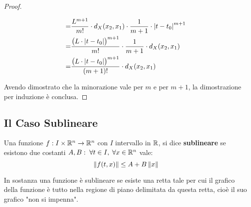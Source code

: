 \begin{theorem}
\begin{proof}
\begin{itemize}
\begin{align*}
				= &\frac{L^{m+1}}{m!} \cdot d_X(x_2,x_1)
				\cdot \frac{1}{m+1} \cdot \left|t-t_0\right|^{m+1}\\
				= &\frac{\bigl(L \cdot \left|t-t_0\right|\bigr)^{m+1}}{m!} \cdot \frac{1}{m+1} \cdot d_X(x_2,x_1)\\
				= &\frac{\bigl(L \cdot \left|t-t_0\right|\bigr)^{m+1}}{(m+1)!} \cdot d_X(x_2,x_1)
			\end{align*}
		\end{itemize}
		Avendo dimostrato che la minorazione vale per $m$ e per $m+1$, la dimostrazione per induzione è conclusa.
	\end{proof}
\end{theorem}
\cbend

\subsection{Il Caso Sublineare}
\begin{definition}
	\label{def:sublineare}
	Una funzione $f:I\times\mathbb{R}^n\to \mathbb{R}^n$ con $I$ intervallo in $\mathbb{R}$, si dice \textbf{sublineare} se esistono due costanti $A, B:\; \forall t \in I,\;\forall x \in \mathbb{R}^n$ vale:
	\[\left\|f(t,x)\right\|\leq A + B \left\|x\right\|\]
	\vspace*{-\baselineskip}
	\begin{note}
		In sostanza una funzione è sublineare se esiste una retta tale per cui il grafico della funzione è tutto nella regione di piano delimitata da questa retta, cioè il suo grafico "non si impenna".
		\begin{center}
		\end{center}
	\end{note}
\end{definition}
